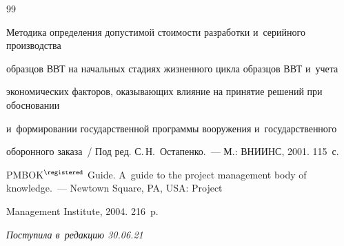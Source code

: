 {{\begin{thebibliography}{99}


Методика определения допустимой стоимости разработки и~серийного производства 


образцов ВВТ на начальных стадиях жизненного цикла образцов ВВТ и~учета 


экономических факторов, оказывающих влияние на принятие решений при обосновании 


и~формировании государственной программы вооружения и~государственного 


оборонного заказа~/ Под ред. С.\,Н.~Остапенко.~--- М.: ВНИИНС, 2001. 115~с.




PMBOK$^\registered$ Guide. A~guide to the project management body of knowledge.~--- Newtown Square, PA, USA: Project 


Management Institute, 2004. 216~p.


  \end{thebibliography}


} }











\vspace*{-3pt}





\hfill{\small\textit{Поступила в~редакцию 30.06.21}}




















\newpage





\vspace*{-28pt}











